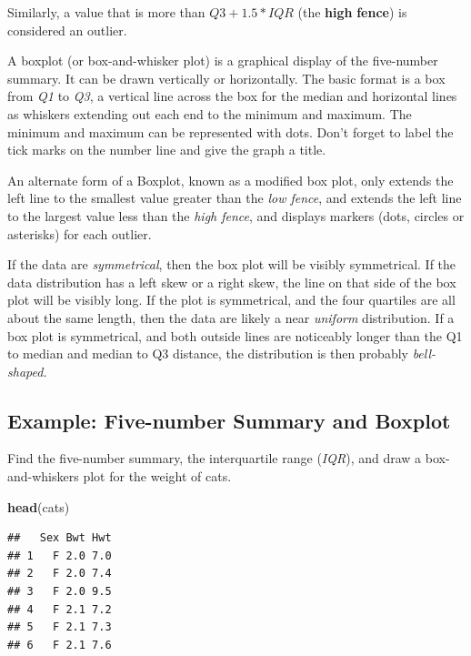 \documentclass[
]{book}
\newenvironment{Shaded}{\begin{snugshade}}{\end{snugshade}}
\newcommand{\KeywordTok}[1]{\textcolor[rgb]{0.13,0.29,0.53}{\textbf{#1}}}
\newcommand{\NormalTok}[1]{#1}
\begin{document}
Similarly, a value that is more than \(Q3+1.5*IQR\) (the \textbf{high} \textbf{fence}) is considered an outlier.

A boxplot (or box-and-whisker plot) is a graphical display of the five-number summary. It can be drawn vertically or horizontally. The basic format is a box from \emph{Q1} to \emph{Q3}, a vertical line across the box for the median and horizontal lines as whiskers extending out each end to the minimum and maximum. The minimum and maximum can be represented with dots. Don't forget to label the tick marks on the number line and give the graph a title.

An alternate form of a Boxplot, known as a modified box plot, only extends the left line to the smallest value greater than the \emph{low fence}, and extends the left line to the largest value less than
the \emph{high fence}, and displays markers (dots, circles or asterisks) for each outlier.

If the data are \emph{symmetrical}, then the box plot will be visibly symmetrical. If the data distribution has a left skew or a right skew, the line on that side of the box plot will be visibly long. If the plot is symmetrical, and the four quartiles are all about the same length, then the data are likely a near \emph{uniform} distribution. If a box plot is symmetrical, and both outside lines are noticeably longer than the Q1 to median and median to Q3 distance, the distribution is then probably \emph{bell-shaped.}

\hypertarget{example-five-number-summary-and-boxplot}{%
\subsection{Example: Five-number Summary and Boxplot}\label{example-five-number-summary-and-boxplot}}

Find the five-number summary, the interquartile range (\emph{IQR}), and draw a box-and-whiskers plot for the weight of cats.

\begin{Shaded}
\begin{Highlighting}[]
\KeywordTok{head}\NormalTok{(cats)}
\end{Highlighting}
\end{Shaded}

\begin{verbatim}
##   Sex Bwt Hwt
## 1   F 2.0 7.0
## 2   F 2.0 7.4
## 3   F 2.0 9.5
## 4   F 2.1 7.2
## 5   F 2.1 7.3
## 6   F 2.1 7.6
\end{verbatim}
\end{document}
